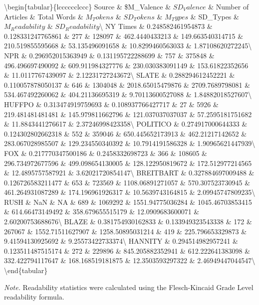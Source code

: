 \documentclass[english,,man]{apa6}
\begin{document}
\textbackslash{}begin\{tabular\}\{lcccccclccc\}
\toprule
Source \& \$M\_Valence \& \(SD_Valence\) \& Number of Articles \& Total Words \& \(M_Tokens\) \& \(SD_Tokens\) \& \(M_Types\) \& SD\_Types \& \(M_Readability\) \& \(SD_Readability\)\textbackslash{}
\midrule
NY Times \& 0.248582461954873 \& 0.128331247765861 \& 277 \& 128097 \& 462.4440433213 \& 149.663540314715 \& 210.519855595668 \& 53.135496091658 \& 10.8299460563033 \& 1.87108620272245\textbackslash{}
NPR \& 0.296952015363949 \& 0.131195722288699 \& 757 \& 375848 \& 496.496697490092 \& 609.911984327776 \& 230.030383091149 \& 153.61822352656 \& 11.0117767439097 \& 2.12231727243672\textbackslash{}
SLATE \& 0.288294612452221 \& 0.110057878050137 \& 646 \& 1304048 \& 2018.65015479876 \& 2709.7689798081 \& 534.467492260062 \& 404.21136695319 \& 9.70113600527088 \& 1.84882018527607\textbackslash{}
HUFFPO \& 0.313474919759693 \& 0.108937766427717 \& 27 \& 5926 \& 219.481481481481 \& 145.979811662796 \& 121.037037037037 \& 57.2595181751682 \& 11.8843441276617 \& 2.37246998423358\textbackslash{}
POLITICO \& 0.274917000644333 \& 0.124302802662318 \& 552 \& 359046 \& 650.445652173913 \& 462.21217142652 \& 283.067028985507 \& 129.234550340392 \& 10.7914191586328 \& 1.90965621447939\textbackslash{}
FOX \& 0.217770347500186 \& 0.2458332698723 \& 366 \& 108605 \& 296.734972677596 \& 499.098654130005 \& 128.122950819672 \& 172.512977214565 \& 12.4895757587921 \& 3.62021720854147\textbackslash{}
BREITBART \& 0.327884697009488 \& 0.126726583211477 \& 653 \& 723569 \& 1108.06891271057 \& 570.307523730945 \& 461.264931087289 \& 174.196961926317 \& 10.5639743164815 \& 2.09945747809235\textbackslash{}
RUSH \& NaN \& NA \& 689 \& 1069292 \& 1551.94775036284 \& 1045.46703853415 \& 614.66473149492 \& 358.679655515179 \& 12.0909683600071 \& 2.60200753688676\textbackslash{}
BLAZE \& 0.381754930162833 \& 0.133949323543338 \& 172 \& 267067 \& 1552.71511627907 \& 1258.50895031214 \& 419 \& 225.796653329873 \& 9.41594130925692 \& 9.25573422733374\textbackslash{}
HANNITY \& 0.294514982957241 \& 0.123511487515174 \& 272 \& 229896 \& 845.205882352941 \& 612.222641383098 \& 332.422794117647 \& 168.168519181875 \& 12.3503593297322 \& 2.46949447044547\textbackslash{}
\bottomrule
\addlinespace
\textbackslash{}end\{tabular\}

\begin{tablenotes}[para]
\normalsize{\textit{Note.} Readability statistics were calculated using the Flesch-Kincaid Grade Level readability formula.}
\end{tablenotes}
\end{document}
